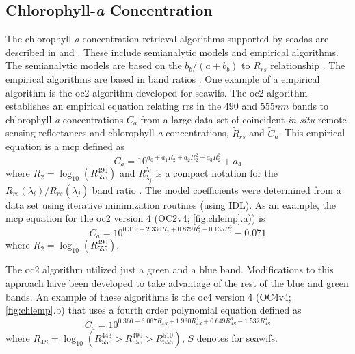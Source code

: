 \subsection{Chlorophyll-{\it a} Concentration}

The chlorophyll-{\it a} concentration retrieval algorithms supported by \gls{seadas} are described in \cite{OReilly1998_Chl} and \cite{OReilly2000}. These include semianalytic models and empirical algorithms. The semianalytic models are based on the $b_b/(a + b_b)$ to $R_{rs}$ relationship \cite{Gordon:1988qv}. The empirical algorithms are based in band ratios \cite{OReilly2000}. One example of a empirical algorithm is the \gls{oc2} algorithm developed for \gls{seawifs}. The \gls{oc2} algorithm establishes an empirical equation relating \gls{rrs} in the $490$ and $555nm$ bands to chlorophyll-{\it a} concentrations $C_a$ from a large data set of coincident {\it in situ} remote-sensing reflectances and chlorophyll-{\it a} concentrations, $\tilde{R}_{rs}$ and $\tilde{C}_a$. This empirical equation is a \gls{mcp} defined as
\begin{equation}\label{eq:oc2}
  C_a = 10^{\displaystyle a_0+a_1R_2+a_2R_2^2+a_3R_2^3} + a_4
\end{equation}
\noindent where $R_2=\log_{10}\left(R_{555}^{490}\right)$ and $R_{\lambda_j}^{\lambda_i}$ is a compact notation for the $R_{rs}(\lambda_i)/R_{rs}(\lambda_j)$ band ratio \cite{OReilly2000}. The model coefficients were determined from a data set using iterative minimization routines (using IDL). As an example, the \gls{mcp} equation for the \gls{oc2} version 4 (OC2v4; \autoref{fig:chlemp}.a)) is
\begin{equation}
  C_a = 10^{\displaystyle 0.319-2.336R_2+0.879R_2^2-0.135R_2^3} - 0.071
\end{equation}
\noindent where $R_2=\log_{10}\left(R_{555}^{490}\right)$.

The \gls{oc2} algorithm utilized just a green and a blue band. Modifications to this approach have been developed to take advantage of the rest of the blue and green bands. An example of these algorithms is the \gls{oc4} version 4 (OC4v4; \autoref{fig:chlemp}.b) that uses a fourth order polynomial equation defined as
\begin{equation}
  C_a = 10^{\displaystyle 0.366-3.067R_{4S}+1.930R_{4S}^2+0.649R_{4S}^3-1.532R_{4S}^4}
\end{equation}
\noindent where $R_{4S}=\log_{10}\left(R_{555}^{443}>R_{555}^{490}>R_{555}^{510}\right)$, $S$ denotes for \gls{seawifs}.

